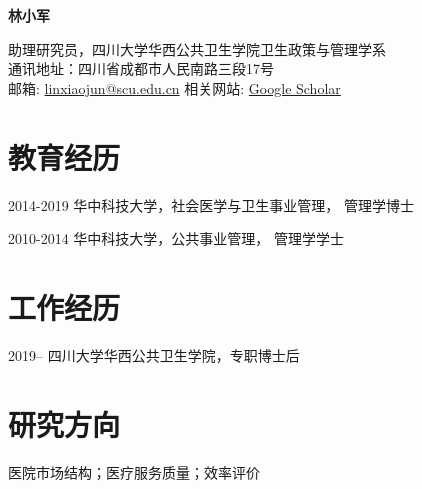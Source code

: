 \documentclass[12pt,letterpaper]{report}
\newcommand{\myname}{林小军}
\newcommand{\namefont}[1]{{\normalfont\bfseries\Huge{#1}}}
\newcommand{\listitemspace}{0.15em}
\renewenvironment{itemize}
{\begin{list}{}{\setlength{\leftmargin}{0em}
            \setlength{\parskip}{0em}
            \setlength{\itemsep}{\listitemspace}
            \setlength{\parsep}{\listitemspace}}}
    {\end{list}}
\begin{document}
    \raggedright

    \namefont{\myname}

    \vspace{1em}
    \begin{minipage}[t]{0.68\textwidth}
    	助理研究员，四川大学华西公共卫生学院卫生政策与管理学系\\
        通讯地址：{四川省成都市人民南路三段17号} \\
        邮箱: \href{mailto:linxiaojun@scu.edu.cn}{linxiaojun@scu.edu.cn}  \space  相关网站: \href{https://scholar.google.com/citations?user=ZBGYTowAAAAJ&hl=en}{Google Scholar}
    \end{minipage}
    
    \vspace{0.5em}


    \section*{教育经历}

    \begin{tablist}

        \item[2014-2019] \tab 华中科技大学，社会医学与卫生事业管理， 管理学博士
        \item[2010-2014] \tab 华中科技大学，公共事业管理， 管理学学士

    \end{tablist}



    \section*{工作经历}

    \begin{tablist}

        \item[2019--]   \tab 四川大学华西公共卫生学院，专职博士后                       

    \end{tablist}



    \section*{研究方向 }

    \begin{itemize}

        \item 医院市场结构；医疗服务质量；效率评价

    \end{itemize}
\end{document}
